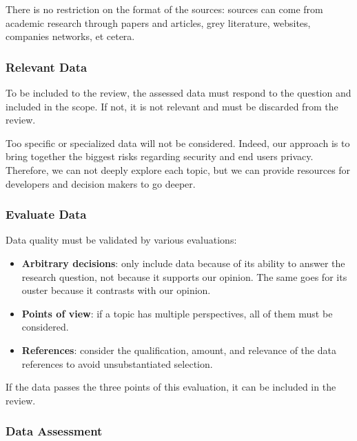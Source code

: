 There is no restriction on the format of the sources: sources can come from academic research through papers and articles, grey literature, websites, companies networks, et cetera.

\subsubsection{Relevant Data}
\label{subsubsec:state_methodology_approach_relevant}

To be included to the review, the assessed data must respond to the question and included in the scope. If not, it is not relevant and must be discarded from the review.

Too specific or specialized data will not be considered. Indeed, our approach is to bring together the biggest risks regarding security and end users privacy. Therefore, we can not deeply explore each topic, but we can provide resources for developers and decision makers to go deeper.

\subsubsection{Evaluate Data}
\label{subsubsec:state_methodology_approach_evaluate}

Data quality must be validated by various evaluations:
\begin{itemize}
    \item \textbf{Arbitrary decisions}: only include data because of its ability to answer the research question, not because it supports our opinion. The same goes for its ouster because it contrasts with our opinion.
    \item \textbf{Points of view}: if a topic has multiple perspectives, all of them must be considered.
    \item \textbf{References}: consider the qualification, amount, and relevance of the data references to avoid unsubstantiated selection.
\end{itemize}

If the data passes the three points of this evaluation, it can be included in the review.

\subsubsection{Data Assessment}
\label{subsubsec:state_methodology_approach_assessment}

